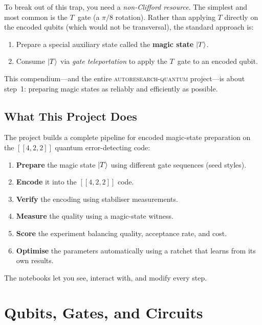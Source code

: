 \documentclass[11pt,a4paper,twoside]{report}
\theoremstyle{definition}
\newcommand{\ketT}{\ket{T}}
\begin{document}
To break out of this trap, you need a \emph{non-Clifford resource}. The
simplest and most common is the $T$~gate (a $\pi/8$ rotation). Rather
than applying $T$ directly on the encoded qubits (which would not be
transversal), the standard approach is:

\begin{enumerate}
  \item Prepare a special auxiliary state called the \textbf{magic state}
        $\ketT$.
  \item Consume $\ketT$ via \emph{gate teleportation} to apply the
        $T$~gate to an encoded qubit.
\end{enumerate}

This compendium---and the entire \textsc{autoresearch-quantum}
project---is about step~1: preparing magic states as reliably and
efficiently as possible.

\section{What This Project Does}

The project builds a complete pipeline for encoded magic-state
preparation on the $[\![4,2,2]\!]$ quantum error-detecting code:

\begin{enumerate}
  \item \textbf{Prepare} the magic state $\ketT$ using different gate
        sequences (seed styles).
  \item \textbf{Encode} it into the $[\![4,2,2]\!]$ code.
  \item \textbf{Verify} the encoding using stabiliser measurements.
  \item \textbf{Measure} the quality using a magic-state witness.
  \item \textbf{Score} the experiment balancing quality, acceptance rate,
        and cost.
  \item \textbf{Optimise} the parameters automatically using a ratchet
        that learns from its own results.
\end{enumerate}

The notebooks let you see, interact with, and modify every step.

\chapter{Qubits, Gates, and Circuits}
\label{ch:qubits}
\end{document}
